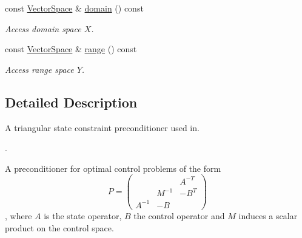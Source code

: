 \begin{DoxyCompactItemize}
\hypertarget{classSpacy_1_1OperatorBase_a2588f9b3e0188820c4c494e63293dc6f}{const \hyperlink{classSpacy_1_1VectorSpace}{\-Vector\-Space} \& \hyperlink{classSpacy_1_1OperatorBase_a2588f9b3e0188820c4c494e63293dc6f}{domain} () const }\label{classSpacy_1_1OperatorBase_a2588f9b3e0188820c4c494e63293dc6f}

\begin{DoxyCompactList}\small\item\em \-Access domain space $X$. \end{DoxyCompactList}\item 
\hypertarget{classSpacy_1_1OperatorBase_ab19d3b7a6f290b1079248f1e567e53d6}{const \hyperlink{classSpacy_1_1VectorSpace}{\-Vector\-Space} \& \hyperlink{classSpacy_1_1OperatorBase_ab19d3b7a6f290b1079248f1e567e53d6}{range} () const }\label{classSpacy_1_1OperatorBase_ab19d3b7a6f290b1079248f1e567e53d6}

\begin{DoxyCompactList}\small\item\em \-Access range space $Y$. \end{DoxyCompactList}\end{DoxyCompactItemize}


\subsection{\-Detailed \-Description}
\-A triangular state constraint preconditioner used in. 

\cite{Lubkoll2015a}.

\-A preconditioner for optimal control problems of the form \[ P=\left( \begin{array}{ccc} & & A^{-T} \\ & M^{-1} & -B^T \\ A^{-1} & -B & \end{array} \right)\], where $A$ is the state operator, $B$ the control operator and $M$ induces a scalar product on the control space. 

